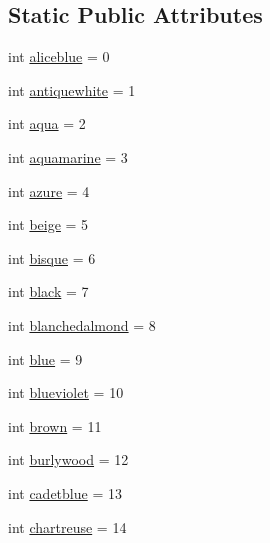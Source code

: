\subsection*{Static Public Attributes}
\begin{DoxyCompactItemize}
\item 
int \hyperlink{classbridges_1_1named__color_1_1_named_color_aee5ed43983f4942acabae2cb74b9c6fd}{aliceblue} = 0
\item 
int \hyperlink{classbridges_1_1named__color_1_1_named_color_a095e0f1c39cca4646342de08f3e2ae08}{antiquewhite} = 1
\item 
int \hyperlink{classbridges_1_1named__color_1_1_named_color_a5b0169dcaba9e476f8e27661a2f8bac2}{aqua} = 2
\item 
int \hyperlink{classbridges_1_1named__color_1_1_named_color_af1ac4e74031b4fd05b57163d563a9203}{aquamarine} = 3
\item 
int \hyperlink{classbridges_1_1named__color_1_1_named_color_a470c7fda14d73fcc3e5e88173f16b61f}{azure} = 4
\item 
int \hyperlink{classbridges_1_1named__color_1_1_named_color_a194e86fe8f9bb60027e034ee154b183d}{beige} = 5
\item 
int \hyperlink{classbridges_1_1named__color_1_1_named_color_a5d6d95062328c5239deb5ec3468c3ae8}{bisque} = 6
\item 
int \hyperlink{classbridges_1_1named__color_1_1_named_color_a2edeb90cbdc17f3dc55f408860c24485}{black} = 7
\item 
int \hyperlink{classbridges_1_1named__color_1_1_named_color_afbfe28e04e02ad5a4ec8db9da002c8b0}{blanchedalmond} = 8
\item 
int \hyperlink{classbridges_1_1named__color_1_1_named_color_a145708a26f3f348fb34085de800c6e67}{blue} = 9
\item 
int \hyperlink{classbridges_1_1named__color_1_1_named_color_aa1705830246a072daff144dba5057c50}{blueviolet} = 10
\item 
int \hyperlink{classbridges_1_1named__color_1_1_named_color_aa3978a16dd98160a2aeebcc80fe63ce2}{brown} = 11
\item 
int \hyperlink{classbridges_1_1named__color_1_1_named_color_aa7c0175b0d2cf1520f533756b751ff7a}{burlywood} = 12
\item 
int \hyperlink{classbridges_1_1named__color_1_1_named_color_ae1f7eeec56380825f5af324ee7c24352}{cadetblue} = 13
\item 
int \hyperlink{classbridges_1_1named__color_1_1_named_color_a1c0ea1996bcc7315e1b18d35bb4266bb}{chartreuse} = 14

\end{DoxyCompactItemize}
